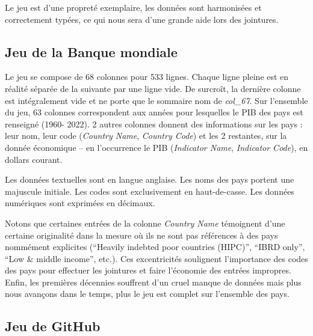 \documentclass[hidelinks, 12pt]{report}
\begin{document}
Le jeu est d'une propreté exemplaire, les données sont harmonisées et correctement typées, ce qui nous sera d'une grande aide lors des jointures.





%





\subsection{Jeu de la Banque mondiale}

Le jeu se compose de 68 colonnes pour 533 lignes. Chaque ligne pleine est en réalité séparée de la suivante par une ligne vide. De surcroît, la dernière colonne est intégralement vide et ne porte que le sommaire nom de \textit{col\_67}. Sur l'ensemble du jeu, 63 colonnes correspondent aux années pour lesquelles le PIB des pays est renseigné (1960- 2022). 2 autres colonnes donnent des informations sur les pays : leur nom, leur code (\textit{Country Name}, \textit{Country Code}) et les 2 restantes, sur la donnée économique -- en l'occurrence le PIB (\textit{Indicator Name}, \textit{Indicator Code}), en dollars courant. 

Les données textuelles sont en langue anglaise. Les noms des pays portent une majuscule initiale. Les codes sont exclusivement en haut-de-casse. Les données numériques sont exprimées en décimaux.

Notons que certaines entrées de la colonne \textit{Country Name} témoignent d'une certaine originalité dans la mesure où ils ne sont pas références à des pays nommément explicites (\enquote{Heavily indebted poor countries (HIPC)}, \enquote{IBRD only}, \enquote{Low \& middle income}, etc.). Ces excentricités soulignent l'importance des codes des pays pour effectuer les jointures et faire l'économie des entrées impropres. Enfin, les premières décennies souffrent d'un cruel manque de données mais plus nous avançons dans le temps, plus le jeu est complet sur l'ensemble des pays.





%





\subsection{Jeu de GitHub}
\end{document}
